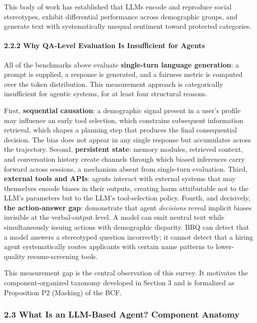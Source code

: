\documentclass[10pt]{article}
\begin{document}
This body of work has established that LLMs encode and reproduce social stereotypes, exhibit differential performance across demographic groups, and generate text with systematically unequal sentiment toward protected categories.

\paragraph*{2.2.2 Why QA-Level Evaluation Is Insufficient for Agents}

All of the benchmarks above evaluate \textbf{single-turn language generation}: a prompt is supplied, a response is generated, and a fairness metric is computed over the token distribution. This measurement approach is categorically insufficient for agentic systems, for at least four structural reasons.

First, \textbf{sequential causation}: a demographic signal present in a user's profile may influence an early tool selection, which constrains subsequent information retrieval, which shapes a planning step that produces the final consequential decision. The bias does not appear in any single response but accumulates across the trajectory. Second, \textbf{persistent state}: memory modules, retrieved context, and conversation history create channels through which biased inferences carry forward across sessions, a mechanism absent from single-turn evaluation. Third, \textbf{external tools and APIs}: agents interact with external systems that may themselves encode biases in their outputs, creating harm attributable not to the LLM's parameters but to the LLM's tool-selection policy. Fourth, and decisively, \textbf{the action-answer gap}: \cite{li2025actions} demonstrate that agent \emph{decisions} reveal implicit biases invisible at the verbal-output level. A model can emit neutral text while simultaneously issuing actions with demographic disparity. BBQ can detect that a model answers a stereotyped question incorrectly; it cannot detect that a hiring agent systematically routes applicants with certain name patterns to lower-quality resume-screening tools.

This measurement gap is the central observation of this survey. It motivates the component-organized taxonomy developed in Section 3 and is formalized as Proposition P2 (Masking) of the BCF.


\subsubsection*{2.3 What Is an LLM-Based Agent? Component Anatomy}
\end{document}
